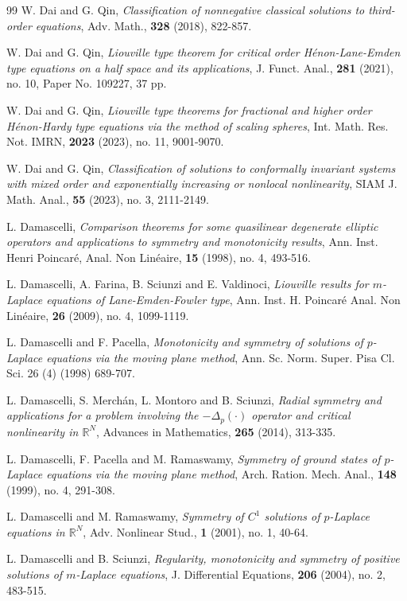 \documentclass[12pt]{amsart}
\theoremstyle{definition}
\theoremstyle{remark}
\theoremstyle{conclusion}
\theoremstyle{conjecture}
\numberwithin{equation}{section}
\newcommand{\R}{\mathbb{R}}
\begin{document}
\begin{thebibliography}{99}
 W. Dai and G. Qin, {\it Classification of nonnegative classical solutions to third-order equations}, Adv. Math., \textbf{328} (2018), 822-857.

 W. Dai and G. Qin, {\it Liouville type theorem for critical order H\'{e}non-Lane-Emden type equations on a half space and its applications}, J. Funct. Anal., \textbf{281} (2021), no. 10, Paper No. 109227, 37 pp.

 W. Dai and G. Qin, {\it Liouville type theorems for fractional and higher order H\'{e}non-Hardy type equations via the method of scaling spheres}, Int. Math. Res. Not. IMRN, \textbf{2023} (2023), no. 11, 9001-9070.

 W. Dai and G. Qin, {\it Classification of solutions to conformally invariant systems with mixed order and exponentially increasing or nonlocal nonlinearity}, SIAM J. Math. Anal., \textbf{55} (2023), no. 3, 2111-2149.

 L. Damascelli, {\it Comparison theorems for some quasilinear degenerate elliptic operators and applications to symmetry and monotonicity results}, Ann. Inst. Henri Poincar\'{e}, Anal. Non Lin\'{e}aire, \textbf{15} (1998), no. 4, 493-516.

 L. Damascelli, A. Farina, B. Sciunzi and E. Valdinoci, {\it Liouville results for $m$-Laplace equations of Lane-Emden-Fowler type}, Ann. Inst. H. Poincar\'{e} Anal. Non Lin\'{e}aire, \textbf{26} (2009), no. 4, 1099-1119.

 L. Damascelli and F. Pacella, {\it Monotonicity and symmetry of solutions of $p$-Laplace equations via the moving plane method}, Ann. Sc. Norm. Super. Pisa Cl. Sci. 26 (4) (1998) 689-707.

 L. Damascelli, S. Merch\'{a}n, L. Montoro and B. Sciunzi, {\it Radial symmetry and applications for a problem involving the $-\Delta_p(\cdot)$ operator and critical nonlinearity in $\R^N$}, Advances in Mathematics, \textbf{265} (2014), 313-335.

 L. Damascelli, F. Pacella and M. Ramaswamy, {\it Symmetry of ground states of $p$-Laplace equations via the moving plane method}, Arch. Ration. Mech. Anal., \textbf{148} (1999), no. 4, 291-308.

 L. Damascelli and M. Ramaswamy, {\it Symmetry of $C^1$ solutions of $p$-Laplace equations in $\R^N$}, Adv. Nonlinear Stud., \textbf{1} (2001), no. 1, 40-64.

 L. Damascelli and B. Sciunzi, {\it Regularity, monotonicity and symmetry of positive solutions of $m$-Laplace equations}, J. Differential Equations, \textbf{206} (2004), no. 2, 483-515.


\end{thebibliography}
\end{document}
